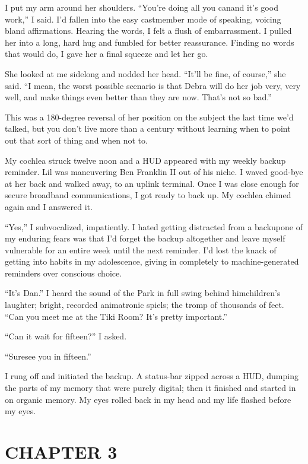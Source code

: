 I put my arm around her shoulders. “You're doing all you can{\dash}and
it's good work,” I said. I'd fallen into the easy castmember mode
of speaking, voicing bland affirmations. Hearing the words, I felt
a flush of embarrassment. I pulled her into a long, hard hug and
fumbled for better reassurance. Finding no words that would do, I
gave her a final squeeze and let her go.

She looked at me sidelong and nodded her head. “It'll be fine, of
course,” she said. “I mean, the worst possible scenario is that
Debra will do her job very, very well, and make things even better
than they are now. That's not so bad.”

This was a 180-degree reversal of her position on the subject the
last time we'd talked, but you don't live more than a century
without learning when to point out that sort of thing and when not
to.

My cochlea struck twelve noon and a HUD appeared with my weekly
backup reminder. Lil was maneuvering Ben Franklin II out of his
niche. I waved good-bye at her back and walked away, to an uplink
terminal. Once I was close enough for secure broadband
communications, I got ready to back up. My cochlea chimed again and
I answered it.

“Yes,” I subvocalized, impatiently. I hated getting distracted from
a backup{\dash}one of my enduring fears was that I'd forget the backup
altogether and leave myself vulnerable for an entire week until the
next reminder. I'd lost the knack of getting into habits in my
adolescence, giving in completely to machine-generated reminders
over conscious choice.

“It's Dan.” I heard the sound of the Park in full swing behind
him{\dash}children's laughter; bright, recorded animatronic spiels; the
tromp of thousands of feet. “Can you meet me at the Tiki Room? It's
pretty important.”

“Can it wait for fifteen?” I asked.

“Sure{\dash}see you in fifteen.”

I rung off and initiated the backup. A status-bar zipped across a
HUD, dumping the parts of my memory that were purely digital; then
it finished and started in on organic memory. My eyes rolled back
in my head and my life flashed before my eyes.

\section{CHAPTER 3}

